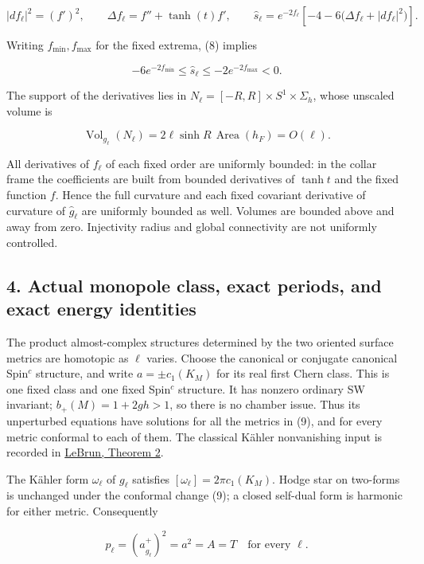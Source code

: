 \documentclass[
  11pt,
]{article}
\begin{document}
\[
 |df_\ell|^2=(f')^2,\qquad
 \Delta f_\ell=f''+\tanh(t)f',\qquad
 \widehat s_\ell=e^{-2f_\ell}
       \left[-4-6\bigl(\Delta f_\ell+|df_\ell|^2\bigr)\right].
 \tag{10}
\]

Writing \(f_{\min},f_{\max}\) for the fixed extrema, (8) implies

\[
 -6e^{-2f_{\min}}\le\widehat s_\ell
 \le-2e^{-2f_{\max}}<0.
 \tag{11}
\]

The support of the derivatives lies in
\(N_\ell=[-R,R]\times S^1\times\Sigma_h\), whose unscaled volume is

\[
 \operatorname{Vol}_{g_\ell}(N_\ell)
 =2\ell\sinh R\,\operatorname{Area}(h_F)=O(\ell).
 \tag{12}
\]

All derivatives of \(f_\ell\) of each fixed order are uniformly bounded:
in the collar frame the coefficients are built from bounded derivatives
of \(\tanh t\) and the fixed function \(f\). Hence the full curvature
and each fixed covariant derivative of curvature of \(\widehat g_\ell\)
are uniformly bounded as well. Volumes are bounded above and away from
zero. Injectivity radius and global connectivity are not uniformly
controlled.

\hypertarget{actual-monopole-class-exact-periods-and-exact-energy-identities}{%
\subsection{4. Actual monopole class, exact periods, and exact energy
identities}\label{actual-monopole-class-exact-periods-and-exact-energy-identities}}

The product almost-complex structures determined by the two oriented
surface metrics are homotopic as \(\ell\) varies. Choose the canonical
or conjugate canonical Spin\(^c\) structure, and write
\(a=\pm c_1(K_M)\) for its real first Chern class. This is one fixed
class and one fixed Spin\(^c\) structure. It has nonzero ordinary SW
invariant; \(b_+(M)=1+2gh>1\), so there is no chamber issue. Thus its
unperturbed equations have solutions for all the metrics in (9), and for
every metric conformal to each of them. The classical Kähler
nonvanishing input is recorded in
\href{https://arxiv.org/pdf/dg-ga/9412006}{LeBrun, Theorem 2}.

The Kähler form \(\omega_\ell\) of \(g_\ell\) satisfies
\([\omega_\ell]=2\pi c_1(K_M)\). Hodge star on two-forms is unchanged
under the conformal change (9); a closed self-dual form is harmonic for
either metric. Consequently

\[
 \boxed{p_\ell=(a_{\widehat g_\ell}^+)^2=a^2=A=T\quad\text{for every }\ell.}
 \tag{13}
\]
\end{document}
